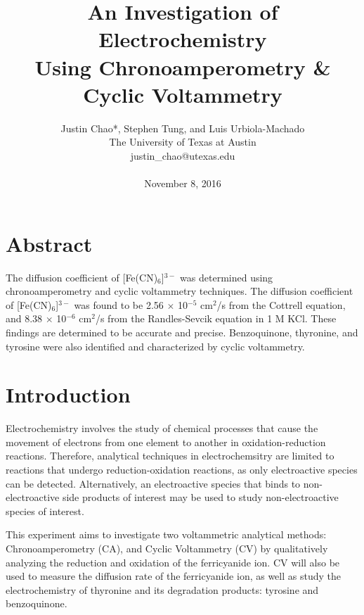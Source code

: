 \documentclass{article}
\title{An Investigation of Electrochemistry \\
Using Chronoamperometry \& Cyclic Voltammetry}
\author{{Justin Chao*, Stephen Tung, and Luis Urbiola-Machado}\\[2ex]
The University of Texas at Austin \\ 
justin\_chao@utexas.edu \\ \\
November 8, 2016}
\date{}
\begin{document}
\maketitle
\unskip\vspace{1.5\baselineskip}


\begin{multicols}{2}

{\fontsize{9.5}{12}\selectfont   

\section*{Abstract} 
    The diffusion coefficient of [Fe(CN)$_6$]$^{3-}$ was determined using
    chronoamperometry and cyclic voltammetry techniques. 
    The diffusion coefficient of [Fe(CN)$_6$]$^{3-}$ was found to be 2.56 $\times$
    10$^{-5}$ cm$^2$/s from the Cottrell equation, and 8.38 $\times$ 10$^{-6}$
    cm$^2$/s from the Randles-Sevcik equation in 1 M KCl. 
    These findings are determined to be accurate and precise. 
    Benzoquinone, thyronine, and tyrosine were also identified and characterized
    by cyclic voltammetry.

\section*{Introduction}
Electrochemistry involves the study of chemical processes that cause the
movement of electrons from one element to another in oxidation-reduction
reactions. Therefore, analytical techniques in electrochemsitry are limited to
reactions that undergo reduction-oxidation reactions, as only electroactive
species can be detected. Alternatively, an electroactive species that binds to
non-electroactive side products of interest may be used to study
    non-electroactive species of interest. \cite{lab_man}

This experiment aims to investigate two voltammetric analytical methods:
Chronoamperometry (CA), and Cyclic Voltammetry (CV) by qualitatively analyzing the
reduction and oxidation of the ferricyanide ion. CV will also be used to
measure the diffusion rate of the ferricyanide ion, as well as study the
electrochemistry of thyronine and its degradation products: tyrosine and
benzoquinone.
   
}
\end{multicols}
\end{document}
